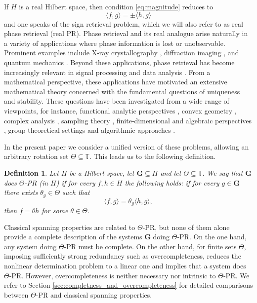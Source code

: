 \documentclass[reqno,a4paper,11pt]{amsart}
\numberwithin{equation}{section}
\newtheorem{definition}{Definition}[section]
\def\T{{\mathbb T}}
\newcommand\1{\mathds{1}}
\begin{document}
If $H$ is a real Hilbert space, then condition \ref{eq:magnitude} reduces to
\begin{equation}\label{eq:sign}
    \langle f,g \rangle =  \pm \langle h,g \rangle
\end{equation}
and one speaks of the sign retrieval problem, which we will also refer to as real phase retrieval (real PR). Phase retrieval and its real analogue arise naturally in a variety of applications where phase information is lost or unobservable. Prominent examples include X-ray crystallography \cite{elser2003solution,thibault2008high}, diffraction imaging \cite{miao2015beyond,shechtman2015phase}, and quantum mechanics \cite{orl1994phase,raymer1997measuring}. Beyond these applications, phase retrieval has become increasingly relevant in signal processing and data analysis \cite{mallat2016understanding}. From a mathematical perspective, these applications have motivated an extensive mathematical theory concerned with the fundamental questions of uniqueness and stability. These questions have been investigated from a wide range of viewpoints, for instance, functional analytic perspectives \cite{Freeman2024,christ2022examples,freeman2025cahill,aldroubi2020phaseless,alharbi2023stable}, convex geometry \cite{bianchi2011phase}, complex analysis \cite{grohs2021stable,jaming2014uniqueness,wellershoff2024phase}, sampling theory \cite{grohs2025phase,jaming2024gabor,ramos,alaifari2024unique}, finite-dimensional and algebraic perspectives \cite{bendory2022algebraic,amir2025stability}, group-theoretical settings \cite{bartusel2023phase} and algorithmic approaches \cite{candes2015phase,candes2015phase2,steinerberger2022eigenvector}.

In the present paper we consider a unified version of these problems, allowing an arbitrary rotation set $\Theta \subseteq \T$. This leads us to the following definition.

\begin{definition}
Let $H$ be a Hilbert space, let $\mathbf{G} \subseteq H$ and let $\Theta \subseteq \T$. We say that $\mathbf{G}$ does $\Theta$-PR (in $H$) if for every $f,h \in H$ the following holds: if for every $g \in \mathbf{G}$ there exists $\theta_g \in \Theta$ such that
\begin{equation}\label{eq:theta_pr}
    \langle f,g \rangle = \theta_g \langle h,g \rangle,
\end{equation}
then $f=\theta h$ for some $\theta \in \Theta$.
\end{definition}

Classical spanning properties are related to $\Theta$-PR, but none of them alone provide a complete description of the systems $\mathbf{G}$ doing $\Theta$-PR. On the one hand, any system doing $\Theta$-PR must be complete. On the other hand, for finite sets $\Theta$, imposing sufficiently strong redundancy such as overcompleteness, reduces the nonlinear determination problem to a linear one and implies that a system does $\Theta$-PR. However, overcompleteness is neither necessary nor intrinsic to $\Theta$-PR. We refer to Section \ref{sec:completness_and_overcompleteness} for detailed comparisons between $\Theta$-PR and classical spanning properties.
\end{document}
